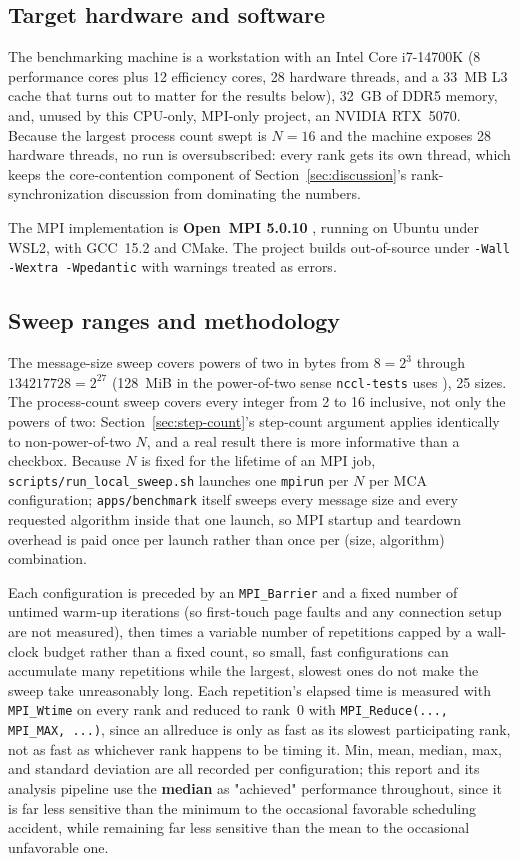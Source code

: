 \subsection{Target hardware and software}

The benchmarking machine is a workstation with an Intel Core i7-14700K (8 performance cores plus 12 efficiency cores, 28 hardware threads, and a 33~MB L3 cache that turns out to matter for the results below), 32~GB of DDR5 memory, and, unused by this CPU-only, MPI-only project, an NVIDIA RTX~5070. Because the largest process count swept is $N = 16$ and the machine exposes 28 hardware threads, no run is oversubscribed: every rank gets its own thread, which keeps the core-contention component of Section~\ref{sec:discussion}'s rank-synchronization discussion from dominating the numbers.

The MPI implementation is \textbf{Open~MPI 5.0.10} \citep{gabriel2004openmpi}, running on Ubuntu under WSL2, with GCC~15.2 and CMake. The project builds out-of-source under \texttt{-Wall -Wextra -Wpedantic} with warnings treated as errors.

\subsection{Sweep ranges and methodology}

The message-size sweep covers powers of two in bytes from $8 = 2^3$ through $134217728 = 2^{27}$ (128~MiB in the power-of-two sense \texttt{nccl-tests} uses \citep{nvidia2024ncclperf}), 25 sizes. The process-count sweep covers every integer from 2 to 16 inclusive, not only the powers of two: Section~\ref{sec:step-count}'s step-count argument applies identically to non-power-of-two $N$, and a real result there is more informative than a checkbox. Because $N$ is fixed for the lifetime of an MPI job, \texttt{scripts/run\_local\_sweep.sh} launches one \texttt{mpirun} per $N$ per MCA configuration; \texttt{apps/benchmark} itself sweeps every message size and every requested algorithm inside that one launch, so MPI startup and teardown overhead is paid once per launch rather than once per (size, algorithm) combination.

Each configuration is preceded by an \texttt{MPI\_Barrier} and a fixed number of untimed warm-up iterations (so first-touch page faults and any connection setup are not measured), then times a variable number of repetitions capped by a wall-clock budget rather than a fixed count, so small, fast configurations can accumulate many repetitions while the largest, slowest ones do not make the sweep take unreasonably long. Each repetition's elapsed time is measured with \texttt{MPI\_Wtime} on every rank and reduced to rank~0 with \texttt{MPI\_Reduce(..., MPI\_MAX, ...)}, since an allreduce is only as fast as its slowest participating rank, not as fast as whichever rank happens to be timing it. Min, mean, median, max, and standard deviation are all recorded per configuration; this report and its analysis pipeline use the \textbf{median} as "achieved" performance throughout, since it is far less sensitive than the minimum to the occasional favorable scheduling accident, while remaining far less sensitive than the mean to the occasional unfavorable one.

